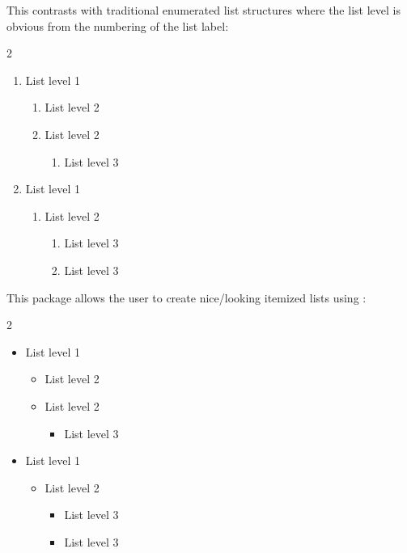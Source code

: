 \documentclass{beery}
\begin{document}
This contrasts with traditional enumerated list structures where the list level is obvious from the numbering of the list label:

\begin{multicols}{2}
  \begin{enumerate}
    \item List level 1
    \begin{enumerate}
      \item List level 2
      \item List level 2
      \begin{enumerate}
        \item List level 3
      \end{enumerate}
    \end{enumerate}
    \item List level 1
    \begin{enumerate}
      \item List level 2
      \begin{enumerate}
        \item List level 3
        \item List level 3
      \end{enumerate}
    \end{enumerate}
  \end{enumerate}
\end{multicols}

This package allows the user to create nice\-/looking itemized lists using :

\begin{multicols}{2}
  \begin{itemize}
    \item List level 1
    \begin{itemize}
      \item List level 2
      \item List level 2
      \begin{itemize}
        \item List level 3
      \end{itemize}
    \end{itemize}
    \item List level 1
    \begin{itemize}
      \item List level 2
      \begin{itemize}
        \item List level 3
        \item List level 3
      \end{itemize}
    \end{itemize}
  \end{itemize}
\end{multicols}
\end{document}
